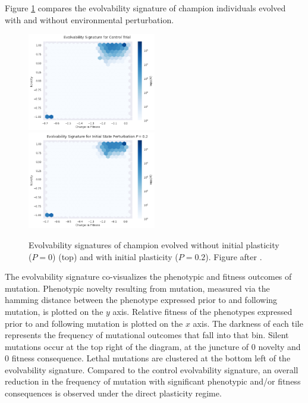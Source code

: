 Figure \ref{fig:es_direct} compares the evolvability signature of champion individuals evolved with and without environmental perturbation.
\begin{figure}
    \centering
    \includegraphics[width=0.5\textwidth]{img/es_p0} \\
    \includegraphics[width=0.5\textwidth]{img/es_p0_2}
\caption{Evolvability signatures of champion evolved without initial plasticity ($P = 0$) (top) and with initial plasticity ($P=0.2$). Figure after \cite{Tarapore2015EvolvabilityBenchmarks}.}
    \label{fig:es_direct}
\end{figure}
The evolvability signature co-visualizes the phenotypic and fitness outcomes of mutation.
Phenotypic novelty resulting from mutation, measured via the hamming distance between the phenotype expressed prior to and following mutation, is plotted on the $y$ axis.
Relative fitness of the phenotypes expressed prior to and following mutation is plotted on the $x$ axis.
The darkness of each tile represents the frequency of mutational outcomes that fall into that bin.
Silent mutations occur at the top right of the diagram, at the juncture of 0 novelty and 0 fitness consequence.
Lethal mutations are clustered at the bottom left of the evolvability signature.
Compared to the control evolvability signature, an overall reduction in the frequency of mutation with significant phenotypic and/or fitness consequences is observed under the direct plasticity regime.

